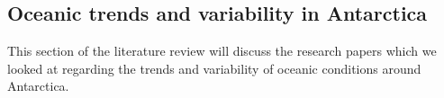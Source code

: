 \subsection{Oceanic trends and variability in Antarctica}
This section of the literature review will discuss the research papers which we looked at regarding the trends and variability of oceanic conditions around Antarctica.